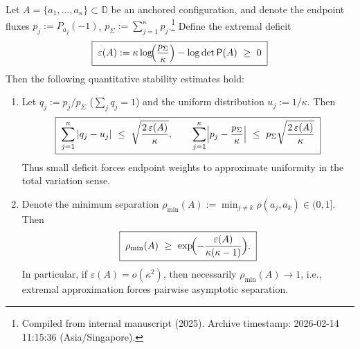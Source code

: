 \begin{corollary}\label{cor:xi-anchored-capacity-extremal-stability-quant}
Let \(A=\{a_1,\dots,a_\kappa\}\subset\mathbb{D}\) be an anchored configuration, and denote the endpoint fluxes \(p_j:=P_{a_j}(-1)\), \(p_{\Sigma}:=\sum_{j=1}^{\kappa}p_j\).\footnote{Compiled from internal manuscript \cite{Internal2025ResolutionFoldingPhiPi} (2025). Archive timestamp: 2026-02-14 11:15:36 (Asia/Singapore).}
Define the extremal deficit
\[
\boxed{\;
\varepsilon(A):=\kappa\log\!\Bigl(\frac{p_{\Sigma}}{\kappa}\Bigr)-\log\det\mathsf P(A)\ \ge\ 0\;}
\]
Then the following quantitative stability estimates hold:
\begin{enumerate}
  \item Let \(q_j:=p_j/p_{\Sigma}\) (\(\sum_j q_j=1\)) and the uniform distribution \(u_j:=1/\kappa\). Then
  \[
  \boxed{\;
  \sum_{j=1}^{\kappa}|q_j-u_j|
  \ \le\
  \sqrt{\frac{2\,\varepsilon(A)}{\kappa}},\qquad
  \sum_{j=1}^{\kappa}\Bigl|p_j-\frac{p_{\Sigma}}{\kappa}\Bigr|
  \ \le\
  p_{\Sigma}\sqrt{\frac{2\,\varepsilon(A)}{\kappa}}\;}
  \]
  Thus small deficit forces endpoint weights to approximate uniformity in the total variation sense.
  \item Denote the minimum separation \(\rho_{\min}(A):=\min_{j\ne k}\rho(a_j,a_k)\in(0,1]\). Then
  \[
  \boxed{\;
  \rho_{\min}(A)\ \ge\ \exp\!\Bigl(-\frac{\varepsilon(A)}{\kappa(\kappa-1)}\Bigr).\;}
  \]
  In particular, if \(\varepsilon(A)=o(\kappa^2)\), then necessarily \(\rho_{\min}(A)\to 1\), i.e., extremal approximation forces pairwise asymptotic separation.
\end{enumerate}
\end{corollary}

